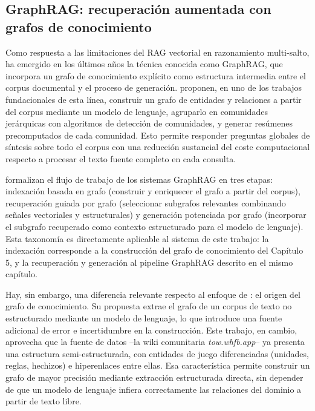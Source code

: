 \documentclass[11pt,a4paper,spanish]{book}
\numberwithin{equation}{chapter}
\numberwithin{figure}{chapter}
\numberwithin{table}{chapter}
\begin{document}
\subsection{GraphRAG: recuperación aumentada con grafos de conocimiento}

Como respuesta a las limitaciones del RAG vectorial en razonamiento multi-salto, ha emergido en los últimos años la técnica conocida como GraphRAG, que incorpora un grafo de conocimiento explícito como estructura intermedia entre el corpus documental y el proceso de generación.  proponen, en uno de los trabajos fundacionales de esta línea, construir un grafo de entidades y relaciones a partir del corpus mediante un modelo de lenguaje, agruparlo en comunidades jerárquicas con algoritmos de detección de comunidades, y generar resúmenes precomputados de cada comunidad. Esto permite responder preguntas globales de síntesis sobre todo el corpus con una reducción sustancial del coste computacional respecto a procesar el texto fuente completo en cada consulta.

 formalizan el flujo de trabajo de los sistemas GraphRAG en tres etapas: indexación basada en grafo (construir y enriquecer el grafo a partir del corpus), recuperación guiada por grafo (seleccionar subgrafos relevantes combinando señales vectoriales y estructurales) y generación potenciada por grafo (incorporar el subgrafo recuperado como contexto estructurado para el modelo de lenguaje). Esta taxonomía es directamente aplicable al sistema de este trabajo: la indexación corresponde a la construcción del grafo de conocimiento del Capítulo 5, y la recuperación y generación al pipeline GraphRAG descrito en el mismo capítulo.

Hay, sin embargo, una diferencia relevante respecto al enfoque de : el origen del grafo de conocimiento. Su propuesta extrae el grafo de un corpus de texto no estructurado mediante un modelo de lenguaje, lo que introduce una fuente adicional de error e incertidumbre en la construcción. Este trabajo, en cambio, aprovecha que la fuente de datos --la wiki comunitaria \emph{tow.whfb.app}-- ya presenta una estructura semi-estructurada, con entidades de juego diferenciadas (unidades, reglas, hechizos) e hiperenlaces entre ellas. Esa característica permite construir un grafo de mayor precisión mediante extracción estructurada directa, sin depender de que un modelo de lenguaje infiera correctamente las relaciones del dominio a partir de texto libre.
\end{document}

